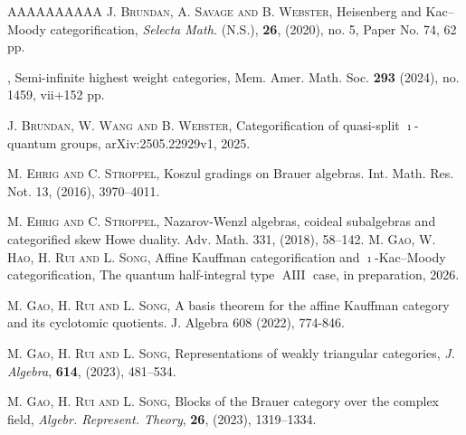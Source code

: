 \documentclass[a4,10pt]{amsart}
\numberwithin{equation}{section}
\theoremstyle{definition}
\begin{document}
\begin{thebibliography}{AAAAAAAAAA}
 {\scshape J. Brundan, A. Savage and B. Webster}, Heisenberg  and Kac--Moody categorification, {\it Selecta Math.} (N.S.), \textbf{26},    (2020), no. 5, Paper No. 74, 62 pp.



, Semi-infinite highest weight categories,   Mem. Amer. Math. Soc. \textbf{293} (2024), no. 1459, vii+152 pp.



 {\scshape J. Brundan, W. Wang and  B. Webster}, Categorification of quasi-split $\imath$-quantum groups, arXiv:2505.22929v1, 2025.

 {\scshape M. Ehrig and C. Stroppel},
     Koszul gradings on Brauer algebras.
Int. Math. Res. Not. 13,
   (2016),
     3970--4011.

      {\scshape M. Ehrig and C. Stroppel},
     Nazarov-{W}enzl algebras, coideal subalgebras and categorified
              skew Howe duality.
Adv. Math. 331,
   (2018),
     58--142.
 {\scshape M. Gao, W. Hao, H. Rui and L. Song}, Affine Kauffman  categorification and $\imath$-Kac--Moody categorification, The quantum half-integral type $\operatorname{AIII}$ case, in preparation, 2026.

 {\scshape M. Gao, H. Rui and  L. Song}, A basis theorem for the affine Kauffman category and its cyclotomic quotients. J. Algebra 608 (2022), 774-846.

 {\scshape M. Gao, H. Rui and  L. Song}, Representations of weakly triangular categories, {\it J. Algebra}, {\bf 614},  (2023), 481--534.

 {\scshape M. Gao, H. Rui and   L. Song}, Blocks of the Brauer category over the complex field, {\it Algebr. Represent. Theory}, {\bf 26},  (2023), 1319--1334.


\end{thebibliography}
\end{document}
